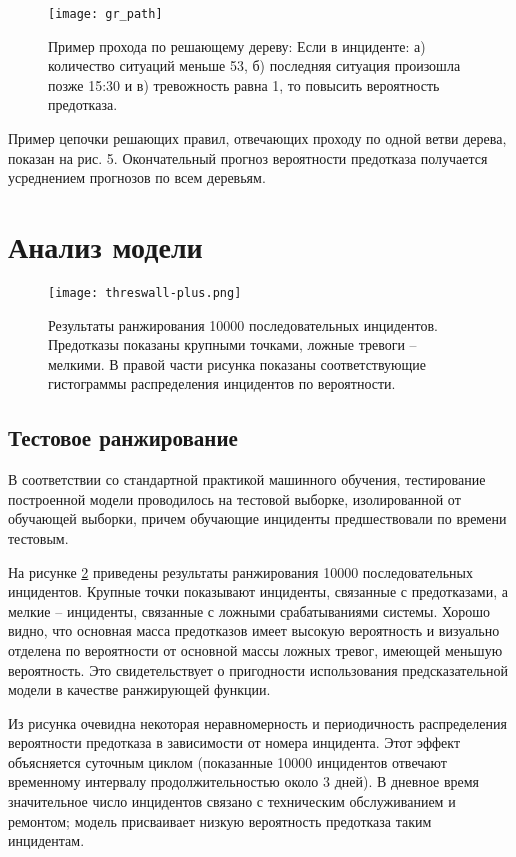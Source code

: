 \begin{figure}
\centering
\texttt{[image: gr\_path]}
\caption{Пример прохода по решающему дереву: Если в инциденте: а) количество ситуаций меньше 53, б) последняя ситуация произошла позже 15:30
и в) тревожность равна 1, то повысить вероятность предотказа.
}
\centering
\label{fig:tree}
\end{figure}

Пример цепочки решающих правил, отвечающих проходу по одной ветви дерева, показан на рис. 5. Окончательный прогноз вероятности предотказа получается усреднением прогнозов по всем деревьям.

\section{Анализ модели}

\begin{figure}[thpb] 
\centering
\texttt{[image: threswall-plus.png]}
\caption{Результаты ранжирования 10000 последовательных инцидентов.  Предотказы показаны крупными точками, ложные тревоги -- мелкими. В правой части рисунка показаны соответствующие гистограммы распределения инцидентов по вероятности.}
\centering
\label{fig:histo}
\end{figure}


\subsection{Тестовое ранжирование}

В соответствии со стандартной практикой машинного обучения, тестирование построенной модели проводилось на тестовой выборке, изолированной от обучающей выборки, причем обучающие инциденты предшествовали по времени тестовым. 

На рисунке \ref{fig:histo} приведены результаты ранжирования 10000 последовательных инцидентов. Крупные точки показывают инциденты, связанные с предотказами, а мелкие -- инциденты, связанные с ложными срабатываниями системы. Хорошо видно, что основная масса предотказов имеет высокую вероятность и визуально отделена по вероятности от основной массы ложных тревог, имеющей меньшую вероятность. Это свидетельствует о пригодности использования предсказательной модели в качестве ранжирующей функции.

Из рисунка очевидна некоторая неравномерность и периодичность распределения вероятности предотказа в зависимости от номера инцидента. Этот эффект объясняется суточным циклом (показанные 10000 инцидентов отвечают временному интервалу продолжительностью около 3 дней). В дневное время значительное число инцидентов связано с техническим обслуживанием и ремонтом; модель присваивает низкую вероятность предотказа таким инцидентам.


